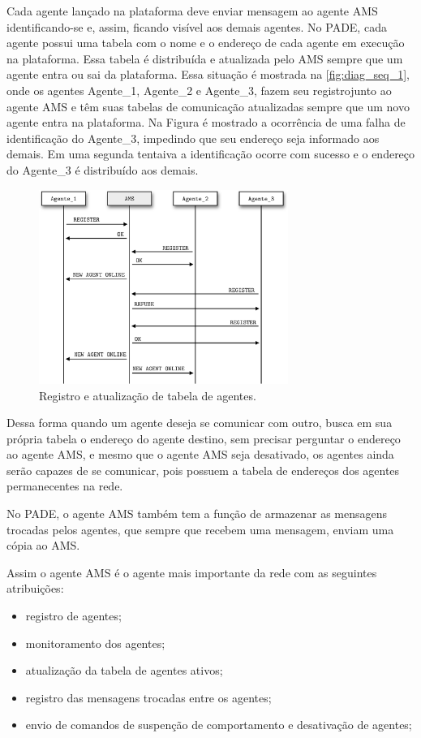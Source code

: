 \documentclass[journal]{IEEEtran}
\begin{document}
Cada agente lançado na plataforma deve enviar mensagem ao agente AMS identificando-se e, assim, ficando visível aos demais agentes. No PADE, cada agente possui uma tabela com o nome e o endereço de cada agente em execução na plataforma. Essa tabela é distribuída e atualizada pelo AMS sempre que um agente entra ou sai da plataforma. Essa situação é mostrada na \autoref{fig:diag_seq_1}, onde os agentes Agente\_1, Agente\_2 e Agente\_3, fazem seu registrojunto ao agente AMS e têm suas tabelas de comunicação atualizadas sempre que um novo agente entra na plataforma. Na Figura é mostrado a ocorrência de uma falha de identificação do Agente\_3, impedindo que seu endereço seja informado aos demais. Em uma segunda tentaiva a identificação ocorre com sucesso e o endereço do Agente\_3 é distribuído aos demais. 

\begin{figure}[!htb]
    \centering
    \includegraphics[width=3.2in]{Figuras/diag_ident.eps}
    \caption{\label{fig:diag_seq_1}Registro e atualização de tabela de agentes.}
\end{figure}

Dessa forma quando um agente deseja se comunicar com outro, busca em sua própria tabela o endereço do agente destino, sem precisar perguntar o endereço ao agente AMS, e mesmo que o agente AMS seja desativado, os agentes ainda serão capazes de se comunicar, pois possuem a tabela de endereços dos agentes permanecentes na rede.

No PADE, o agente AMS também tem a função de armazenar as mensagens trocadas pelos agentes, que sempre que recebem uma mensagem, enviam uma cópia ao AMS.

Assim o agente AMS é o agente mais importante da rede com as seguintes atribuições:

\begin{itemize}
  \item registro de agentes;
  \item monitoramento dos agentes;
  \item atualização da tabela de agentes ativos;
  \item registro das mensagens trocadas entre os agentes;
  \item envio de comandos de suspenção de comportamento e desativação de agentes;
\end{itemize}
\end{document}
